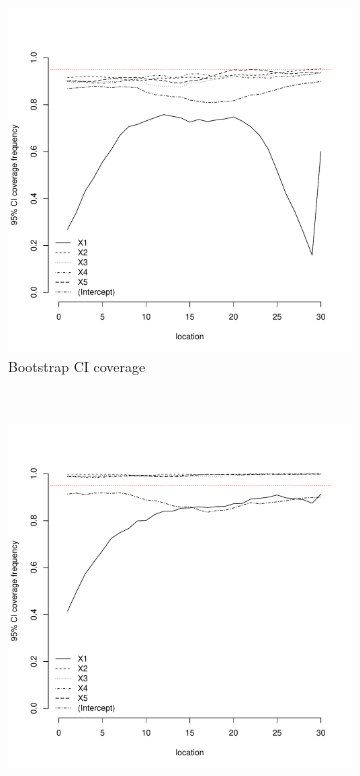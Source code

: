 \documentclass[authoryear, review, 11pt]{elsarticle}
\begin{document}
\begin{figure}
	\vspace{-30mm}
	\centering
	\begin{subfigure}[b]{0.45\textwidth}
	\centering
		\includegraphics[width=\textwidth]{../../figures/simulation/15.14.profile_bootstrap_coverage.pdf}
		\caption{Bootstrap CI coverage}
	\end{subfigure}%
	~ %
	\begin{subfigure}[b]{0.45\textwidth}
	\centering
		\includegraphics[width=\textwidth]{../../figures/simulation/15.14.profile_se_coverage.pdf}

\end{subfigure}
\end{figure}
\end{document}
